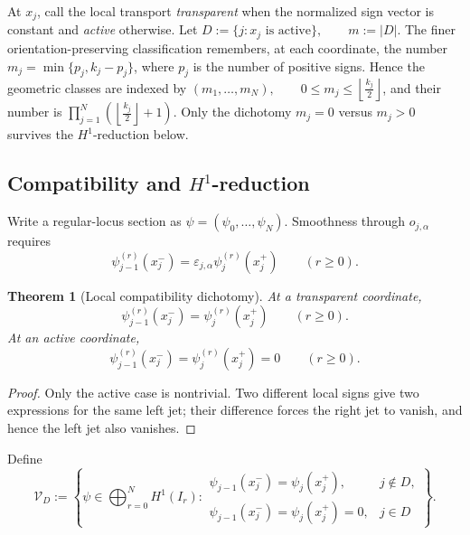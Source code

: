 \documentclass[11pt]{article}
\theoremstyle{plain}
\newtheorem{theorem}{Theorem}[section]
\theoremstyle{definition}
\begin{document}
At \(x_j\), call the local transport \emph{transparent} when the normalized
sign vector is constant and \emph{active} otherwise. Let
\(D := \{j:x_j\text{ is active}\}, \qquad m:=|D|\).
The finer orientation-preserving classification remembers, at each
coordinate, the number
\(m_j = \min\{p_j,k_j-p_j\}\),
where \(p_j\) is the number of positive signs. Hence the geometric classes
are indexed by
\((m_1,\ldots,m_N), \qquad 0\leq m_j\leq \left\lfloor\frac{k_j}{2}\right\rfloor\),
and their number is
\(\prod_{j=1}^{N} \left( \left\lfloor\frac{k_j}{2}\right\rfloor+1 \right)\).
Only the dichotomy \(m_j=0\) versus \(m_j>0\) survives the
\(H^1\)-reduction below.

\subsection{\texorpdfstring{Compatibility and \(H^1\)-reduction}{Compatibility and H1-reduction}}
\label{subsec:multisplit-H1}

Write a regular-locus section as
\(\psi=(\psi_0,\ldots,\psi_N)\).
Smoothness through \(o_{j,\alpha}\) requires
\[
  \psi_{j-1}^{(r)}(x_j^-)
  =
  \varepsilon_{j,\alpha}
  \psi_j^{(r)}(x_j^+)
  \qquad
  (r\geq0).
\]

\begin{theorem}[Local compatibility dichotomy]
\label{thm:multisplit-local-dichotomy}
At a transparent coordinate,
\[
  \psi_{j-1}^{(r)}(x_j^-)
  =
  \psi_j^{(r)}(x_j^+)
  \qquad
  (r\geq0).
\]
At an active coordinate,
\[
  \psi_{j-1}^{(r)}(x_j^-)
  =
  \psi_j^{(r)}(x_j^+)
  =
  0
  \qquad
  (r\geq0).
\]
\end{theorem}

\begin{proof}
Only the active case is nontrivial. Two different local signs give two
expressions for the same left jet; their difference forces the right jet to
vanish, and hence the left jet also vanishes.
\end{proof}

Define
\[
  \mathcal V_D
  :=
  \left\{
    \psi\in\bigoplus_{r=0}^{N}H^1(I_r):
    \begin{array}{ll}
      \psi_{j-1}(x_j^-)=\psi_j(x_j^+),
        &j\notin D,\\[1mm]
      \psi_{j-1}(x_j^-)=\psi_j(x_j^+)=0,
        &j\in D
    \end{array}
  \right\}.
\]
\end{document}
